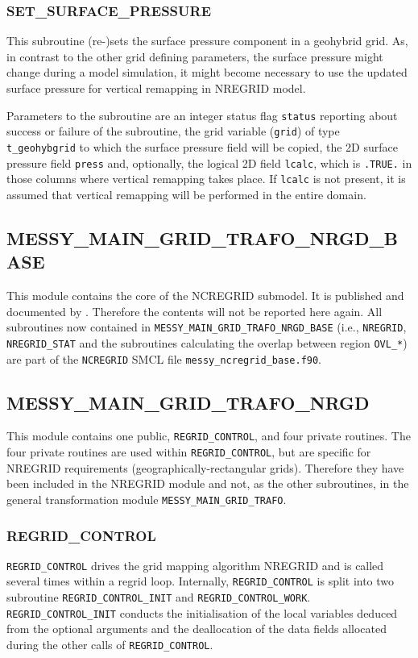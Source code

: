 \documentclass[11pt,twoside]{article}
\begin{document}
\subsubsection{SET\_SURFACE\_PRESSURE\label{SETSPRESS}}
This subroutine (re-)sets the surface pressure component in a geohybrid grid.
As, in contrast to the other grid defining parameters, the surface
pressure might change during a model simulation, it might become
necessary to use the updated surface pressure  for vertical remapping
in NREGRID model.  

Parameters to the subroutine are an integer status flag \verb|status|
reporting about success or failure of the subroutine, the grid variable
(\verb|grid|) of
type  \verb|t_geohybgrid| to which the surface pressure field will be
copied, the 2D surface pressure field \verb|press| and,
optionally, the logical 2D field \verb|lcalc|, which
is \verb|.TRUE.| in those columns  where vertical remapping takes
place. If \verb|lcalc| is not present, it is assumed that vertical
remapping will be performed in the entire domain.
\clearpage
\subsection{MESSY\_MAIN\_GRID\_TRAFO\_NRGD\_BASE\label{MMGTNB}}
This module contains the core of the NCREGRID submodel. It is published
and documented by \cite{Joeckel06a}. Therefore the contents will not be
reported here again. All subroutines now contained in 
\verb|MESSY_MAIN_GRID_TRAFO_NRGD_BASE|
(i.e., \verb|NREGRID|, \verb|NREGRID_STAT| and the subroutines
calculating the overlap between region \verb|OVL_*|) are part of the
\verb|NCREGRID| SMCL file \verb|messy_ncregrid_base.f90|.
\clearpage

\subsection{MESSY\_MAIN\_GRID\_TRAFO\_NRGD\label{MMGTN}}
This module contains one public, \verb|REGRID_CONTROL|,
 and four private routines. The four private routines are used within 
\verb|REGRID_CONTROL|, but are specific for NREGRID requirements
 (geographically-rectangular grids). Therefore they have been included
 in the NREGRID module and not, as the other subroutines, in the
 general transformation module \verb|MESSY_MAIN_GRID_TRAFO|.
\subsubsection{REGRID\_CONTROL\label{RGRDCNTRL}}
\verb|REGRID_CONTROL| drives the grid mapping algorithm NREGRID and is called
 several times  within a regrid loop.
 Internally, \verb|REGRID_CONTROL| is split into 
two  subroutine \verb|REGRID_CONTROL_INIT| and \verb|REGRID_CONTROL_WORK|.
\verb|REGRID_CONTROL_INIT| conducts the
 initialisation of the local variables deduced from the optional arguments and
 the  deallocation of the  
data fields allocated during the other calls of \verb|REGRID_CONTROL|.
\end{document}
